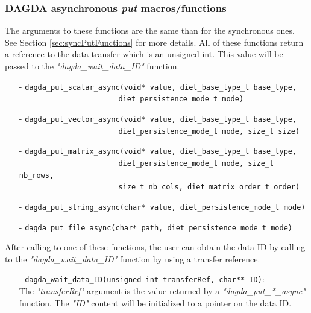 \subsubsection{DAGDA asynchronous \textit{put} macros/functions}
The arguments to these functions are the same than for the synchronous ones.
See Section \ref{sec:syncPutFunctions} for more details. All of these functions
return a reference to the data transfer which is an unsigned int. This value
will be passed to the \textit{"dagda\_wait\_data\_ID"} function.
\begin{itemize}
\item[-] \verb#dagda_put_scalar_async(void* value, diet_base_type_t base_type,#\\
         \verb#                       diet_persistence_mode_t mode)#
\item[-] \verb#dagda_put_vector_async(void* value, diet_base_type_t base_type,#\\
         \verb#                       diet_persistence_mode_t mode, size_t size)#
\item[-] \verb#dagda_put_matrix_async(void* value, diet_base_type_t base_type,#\\
         \verb#                       diet_persistence_mode_t mode, size_t nb_rows,#\\
         \verb#                       size_t nb_cols, diet_matrix_order_t order)#
\item[-] \verb#dagda_put_string_async(char* value, diet_persistence_mode_t mode)#
\item[-] \verb#dagda_put_file_async(char* path, diet_persistence_mode_t mode)#
\end{itemize}
After calling to one of these functions, the user can obtain the data ID by
calling to the \textit{"dagda\_wait\_data\_ID"} function by using a transfer
reference.
\begin{itemize}
  \item[-] \verb#dagda_wait_data_ID(unsigned int transferRef, char** ID)#:\\
    The \textit{"transferRef"} argument is the value returned by a
    \textit{"dagda\_put\_*\_async"} function. The \textit{"ID"} content will
    be initialized to a pointer on the data ID.
\end{itemize}

